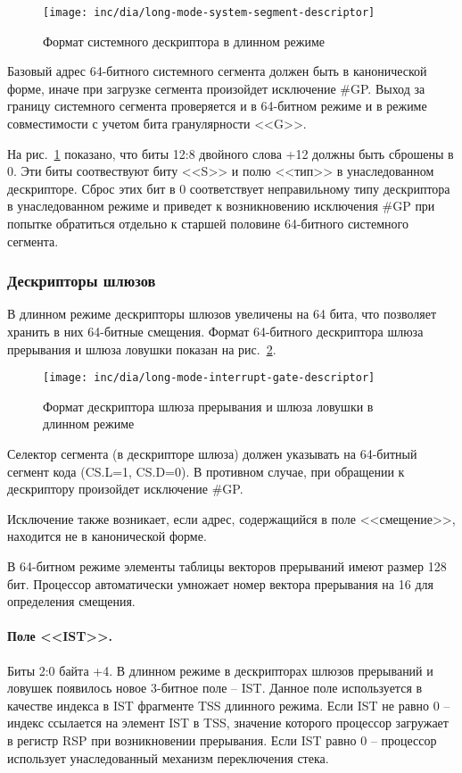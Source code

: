 \begin{figure}[ht!]
  \centering
  \texttt{[image: inc/dia/long-mode-system-segment-descriptor]}
  \caption{Формат системного дескриптора в длинном режиме}
  \label{fig:long-mode-system-segment-descriptor-format}
\end{figure}

Базовый адрес 64-битного системного сегмента должен быть в канонической форме, иначе при
загрузке сегмента произойдет исключение \#GP. Выход за границу системного сегмента проверяется и
в 64-битном режиме и в режиме совместимости с учетом бита гранулярности <<G>>.

На рис.~\ref{fig:long-mode-system-segment-descriptor-format} показано, что биты 12:8 двойного слова +12
должны быть сброшены в 0. Эти биты соотвествуют биту <<S>> и полю <<тип>> в унаследованном дескрипторе.
Сброс этих бит в 0 соответствует неправильному типу дескриптора в унаследованном режиме и приведет
к возникновению исключения \#GP при попытке обратиться отдельно к старшей половине 64-битного системного сегмента.

\subsubsection*{Дескрипторы шлюзов}
В длинном режиме дескрипторы шлюзов увеличены на 64 бита, что позволяет хранить в них 64-битные смещения.
Формат 64-битного дескриптора шлюза прерывания и шлюза ловушки показан на рис.~\ref{fig:long-mode-interrupt-gate-descriptor}.

\begin{figure}[ht!]
  \centering
  \texttt{[image: inc/dia/long-mode-interrupt-gate-descriptor]}
  \caption{Формат дескриптора шлюза прерывания и шлюза ловушки в длинном режиме}
  \label{fig:long-mode-interrupt-gate-descriptor}
\end{figure}

Селектор сегмента (в дескрипторе шлюза) должен указывать на 64-битный сегмент кода (CS.L=1, CS.D=0).
В противном случае, при обращении к дескриптору произойдет исключение \#GP.

Исключение также возникает, если адрес, содержащийся в поле <<смещение>>, находится не в канонической форме.

В 64-битном режиме элементы таблицы векторов прерываний имеют размер 128 бит. Процессор автоматически
умножает номер вектора прерывания на 16 для определения смещения.

\paragraph{Поле <<IST>>.} Биты 2:0 байта +4. В длинном режиме в дескрипторах шлюзов прерываний и ловушек
появилось новое 3-битное поле -- IST. Данное поле используется в качестве индекса в IST фрагменте TSS длинного режима.
Если IST не равно 0 -- индекс ссылается на элемент IST в TSS, значение которого процессор загружает в регистр RSP при
возникновении прерывания. Если IST равно 0 -- процессор использует унаследованный механизм переключения стека.

